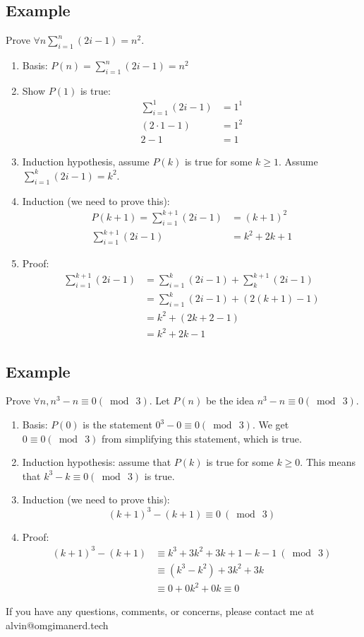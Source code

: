 \documentclass[letterpaper, 12pt]{math}
\begin{document}
\subsection*{Example}
Prove \( \forall{n}\sum_{i=1}^{n}(2i-1) = n^{2} \).
\begin{enumerate}
  \item Basis: \( P(n) = \sum_{i=1}^{n}(2i-1) = n^{2} \)
  \item Show \( P(1) \) is true:
    \begin{align*}
      \sum_{i=1}^{1}(2i-1) &= 1^{1} \\
      (2\cdot1-1) &= 1^{2} \\
      2-1 &= 1
    \end{align*}
  \item Induction hypothesis, assume \( P(k) \) is true for some \( k\geq 1 \).
    Assume \( \sum_{i=1}^{k}(2i-1) = k^{2} \).
  \item Induction (we need to prove this):
    \begin{align*}
      P(k+1) = \sum_{i=1}^{k+1}(2i-1) &= (k+1)^{2} \\
      \sum_{i=1}^{k+1}(2i-1) &= k^{2}+2k+1
    \end{align*}
  \item Proof:
    \begin{align*}
      \sum_{i=1}^{k+1}(2i-1) &= \sum_{i=1}^{k}(2i-1)+\sum_{k}^{k+1}(2i-1) \\
      &= \sum_{i=1}^{k}(2i-1)+(2(k+1)-1) \\
      &= k^{2}+(2k+2-1) \\
      &= k^{2}+2k-1
    \end{align*}
\end{enumerate}

\subsection*{Example}
Prove \( \forall{n}, n^{3}-n \equiv 0 (\bmod\ 3) \). Let \( P(n) \) be the idea
\( n^{3}-n \equiv 0 (\bmod\ 3) \).
\begin{enumerate}
  \item Basis: \( P(0) \) is the statement \( 0^{3}-0 \equiv 0 (\bmod\ 3) \).
    We get \( 0 \equiv 0(\bmod\ 3) \) from simplifying this statement, which is
    true.
  \item Induction hypothesis: assume that \( P(k) \) is true for some
    \( k\geq0 \). This means that \( k^{3}-k \equiv 0(\bmod\ 3) \) is true.
  \item Induction (we need to prove this):
    \[ (k+1)^{3}-(k+1) \equiv 0\ (\bmod\ 3) \]
  \item Proof:
    \begin{align*}
      (k+1)^{3}-(k+1) &\equiv k^{3}+3k^{2}+3k+1-k-1\ (\bmod\ 3) \\
      &\equiv (k^{3}-k^{2})+3k^{2}+3k \\
      &\equiv 0+0k^{2}+0k \equiv 0
    \end{align*}
\end{enumerate}

\begin{center}
  If you have any questions, comments, or concerns, please contact me at
  alvin@omgimanerd.tech
\end{center}
\end{document}
